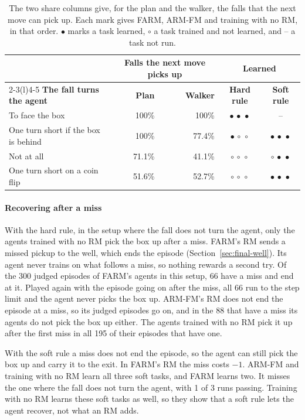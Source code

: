 \documentclass[11pt,english,listoffigures,listoftables]{tfgetsinf}
\newcommand{\loss}[1]{\textcolor{red!60!black}{\bfseries\boldmath #1}}  %
\begin{document}
\begin{table}[H]
\centering
\footnotesize
\renewcommand{\arraystretch}{1.2}
\begin{tabular}{@{}lrrcc@{}}
\toprule
 & \multicolumn{2}{c}{\textbf{Falls the next move picks up}} & \multicolumn{2}{c}{\textbf{Learned}} \\
\cmidrule(lr){2-3}\cmidrule(l){4-5}
\textbf{The fall turns the agent} & \textbf{Plan} & \textbf{Walker} & \textbf{Hard rule} & \textbf{Soft rule} \\ \midrule
To face the box & 100\% & 100\% & $\bullet\,\bullet\,\bullet$ & -- \\
One turn short if the box is behind & 100\% & 77.4\% & $\bullet\,\circ\,\circ$ & $\bullet\,\bullet\,\bullet$ \\
Not at all & 71.1\% & 41.1\% & $\circ\,\circ\,\circ$ & $\circ\,\bullet\,\bullet$ \\
One turn short on a coin flip & 51.6\% & 52.7\% & $\circ\,\circ\,\circ$ & $\bullet\,\bullet\,\bullet$ \\ \bottomrule
\end{tabular}
\caption[A falling box]{The two share columns give, for the plan and the walker, the falls that the next move can pick up. Each mark gives FARM, ARM-FM and training with no RM, in that order. $\bullet$ marks a task learned, $\circ$ a task trained and not learned, and -- a task not run.}
\label{tab:res-box}
\end{table}

\paragraph{Recovering after a miss} With the hard rule, in the setup where the fall does not turn the agent, only the agents trained with no RM pick the box up after a miss. FARM's RM sends a missed pickup to the well, which ends the episode (Section~\ref{sec:final-well}). Its agent never trains on what follows a miss, so nothing rewards a second try. Of the 300 judged episodes of FARM's agents in this setup, 66 have a miss and end at it. Played again with the episode going on after the miss, all 66 run to the step limit and the agent never picks the box up. ARM-FM's RM does not end the episode at a miss, so its judged episodes go on, and in the 88 that have a miss its agents do not pick the box up either. The agents trained with no RM pick it up after the first miss in all 195 of their episodes that have one.

With the soft rule a miss does not end the episode, so the agent can still pick the box up and carry it to the exit. In FARM's RM the miss costs \loss{$-1$}. ARM-FM and training with no RM learn all three soft tasks, and FARM learns two. It misses the one where the fall does not turn the agent, with 1 of 3 runs passing. Training with no RM learns these soft tasks as well, so they show that a soft rule lets the agent recover, not what an RM adds.
\end{document}
